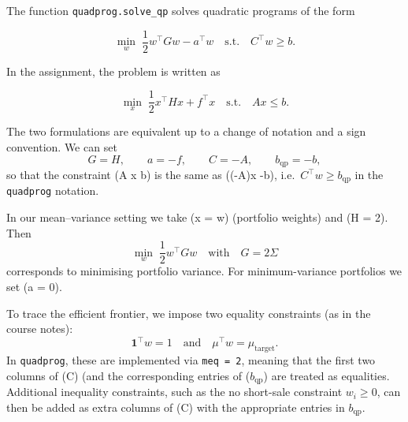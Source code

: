 \documentclass[11pt]{article}
\begin{document}
The function \texttt{quadprog.solve\_qp} solves quadratic programs of
the form

\[
\min_w \; \frac{1}{2} w^\top G w - a^\top w
\quad \text{s.t.} \quad C^\top w \ge b.
\]

In the assignment, the problem is written as

\[
\min_x \; \frac{1}{2} x^\top H x + f^\top x
\quad \text{s.t.} \quad A x \le b.
\]

The two formulations are equivalent up to a change of notation and a
sign convention. We can set \[
G = H, \qquad a = -f, \qquad C = -A, \qquad b_{\text{qp}} = -b,
\] so that the constraint (A x \le b) is the same as ((-A)x \ge -b),
i.e.~\(C^\top w \ge b_{\text{qp}}\) in the \texttt{quadprog} notation.

In our mean--variance setting we take (x = w) (portfolio weights) and (H
= 2\Sigma). Then \[
\min_w \; \frac{1}{2} w^\top G w
\quad \text{with} \quad G = 2\Sigma
\] corresponds to minimising portfolio variance. For minimum-variance
portfolios we set (a = 0).

To trace the efficient frontier, we impose two equality constraints (as
in the course notes): \[
\mathbf{1}^\top w = 1
\quad \text{and} \quad
\mu^\top w = \mu_{\text{target}}.
\] In \texttt{quadprog}, these are implemented via \texttt{meq\ =\ 2},
meaning that the first two columns of (C) (and the corresponding entries
of (\(b_{\text{qp}}\)) are treated as equalities. Additional inequality
constraints, such as the no short-sale constraint \(w_i \ge 0\), can
then be added as extra columns of (C) with the appropriate entries in
\(b_{\text{qp}}\).
\end{document}
